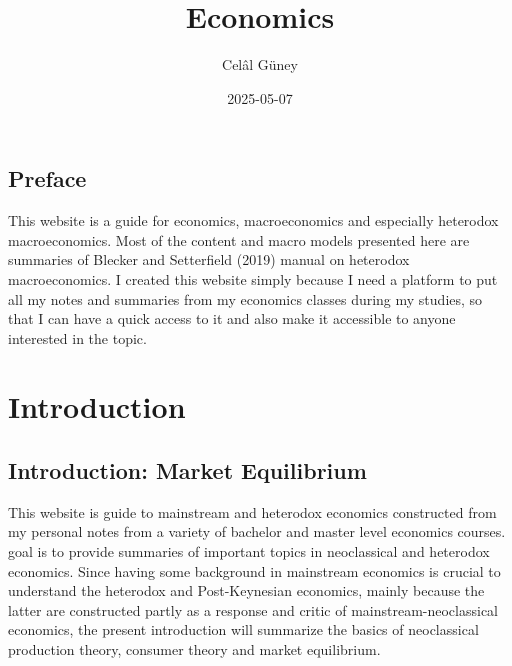 \documentclass[
  letterpaper,
  DIV=11,
  numbers=noendperiod]{scrreprt}
\title{Economics}
\author{Celâl Güney}
\date{2025-05-07}
\renewcommand*\contentsname{Table of contents}
\newcommand\contentsname{Table of contents}
\begin{document}
\maketitle
\ifdefined\Shaded\renewenvironment{Shaded}{\begin{tcolorbox}[boxrule=0pt, breakable, sharp corners, frame hidden, borderline west={3pt}{0pt}{shadecolor}, enhanced, interior hidden]}{\end{tcolorbox}}\fi

\renewcommand*\contentsname{Table of contents}
{
\hypersetup{linkcolor=}
\setcounter{tocdepth}{2}
\tableofcontents
}

\hypertarget{preface}{%
\chapter*{Preface}\label{preface}}


This website is a guide for economics, macroeconomics and especially
heterodox macroeconomics. Most of the content and macro models presented
here are summaries of Blecker and Setterfield (2019) manual on heterodox
macroeconomics. I created this website simply because I need a platform
to put all my notes and summaries from my economics classes during my
studies, so that I can have a quick access to it and also make it
accessible to anyone interested in the topic.

\part{Introduction}

\hypertarget{introduction-market-equilibrium}{%
\chapter{Introduction: Market
Equilibrium}\label{introduction-market-equilibrium}}

This website is guide to mainstream and heterodox economics constructed
from my personal notes from a variety of bachelor and master level
economics courses. goal is to provide summaries of important topics in
neoclassical and heterodox economics. Since having some background in
mainstream economics is crucial to understand the heterodox and
Post-Keynesian economics, mainly because the latter are constructed
partly as a response and critic of mainstream-neoclassical economics,
the present introduction will summarize the basics of neoclassical
production theory, consumer theory and market equilibrium.
\end{document}
